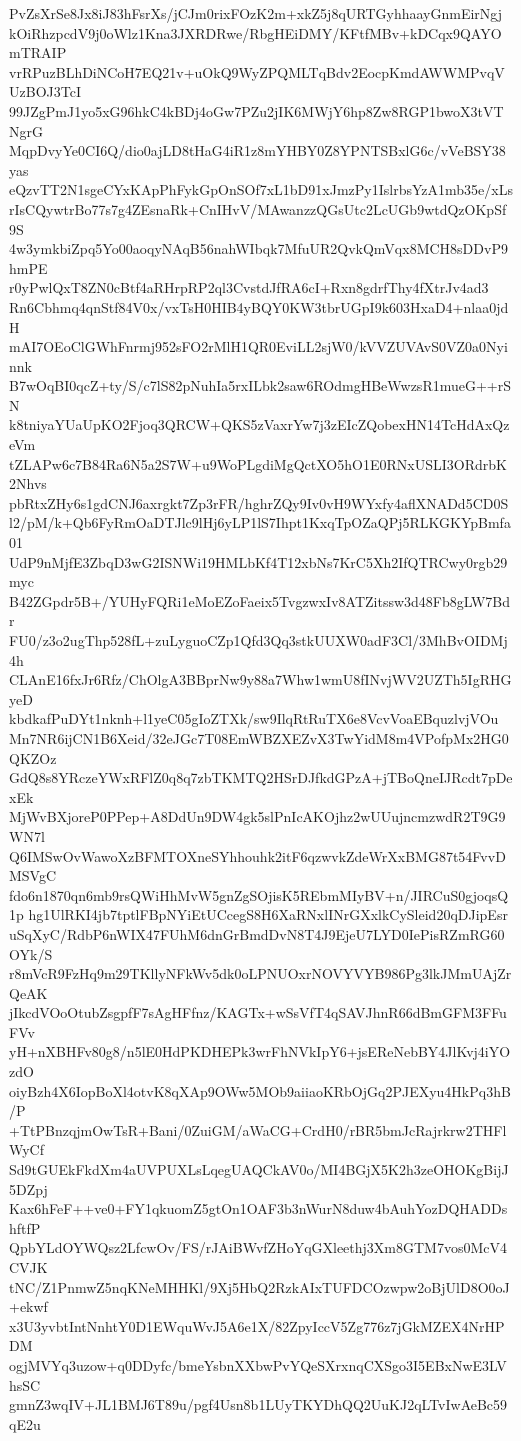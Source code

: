 PvZsXrSe8Jx8iJ83hFsrXs/jCJm0rixFOzK2m+xkZ5j8qURTGyhhaayGnmEirNgj
kOiRhzpcdV9j0oWlz1Kna3JXRDRwe/RbgHEiDMY/KFtfMBv+kDCqx9QAYOmTRAIP
vrRPuzBLhDiNCoH7EQ21v+uOkQ9WyZPQMLTqBdv2EocpKmdAWWMPvqVUzBOJ3TcI
99JZgPmJ1yo5xG96hkC4kBDj4oGw7PZu2jIK6MWjY6hp8Zw8RGP1bwoX3tVTNgrG
MqpDvyYe0CI6Q/dio0ajLD8tHaG4iR1z8mYHBY0Z8YPNTSBxlG6c/vVeBSY38yas
eQzvTT2N1sgeCYxKApPhFykGpOnSOf7xL1bD91xJmzPy1IslrbsYzA1mb35e/xLs
rIsCQywtrBo77s7g4ZEsnaRk+CnIHvV/MAwanzzQGsUtc2LcUGb9wtdQzOKpSf9S
4w3ymkbiZpq5Yo00aoqyNAqB56nahWIbqk7MfuUR2QvkQmVqx8MCH8sDDvP9hmPE
r0yPwlQxT8ZN0cBtf4aRHrpRP2ql3CvstdJfRA6cI+Rxn8gdrfThy4fXtrJv4ad3
Rn6Cbhmq4qnStf84V0x/vxTsH0HIB4yBQY0KW3tbrUGpI9k603HxaD4+nlaa0jdH
mAI7OEoClGWhFnrmj952sFO2rMlH1QR0EviLL2sjW0/kVVZUVAvS0VZ0a0Nyinnk
B7wOqBI0qcZ+ty/S/c7lS82pNuhIa5rxILbk2saw6ROdmgHBeWwzsR1mueG++rSN
k8tniyaYUaUpKO2Fjoq3QRCW+QKS5zVaxrYw7j3zEIcZQobexHN14TcHdAxQzeVm
tZLAPw6c7B84Ra6N5a2S7W+u9WoPLgdiMgQctXO5hO1E0RNxUSLI3ORdrbK2Nhvs
pbRtxZHy6s1gdCNJ6axrgkt7Zp3rFR/hghrZQy9Iv0vH9WYxfy4aflXNADd5CD0S
l2/pM/k+Qb6FyRmOaDTJlc9lHj6yLP1lS7Ihpt1KxqTpOZaQPj5RLKGKYpBmfa01
UdP9nMjfE3ZbqD3wG2ISNWi19HMLbKf4T12xbNs7KrC5Xh2IfQTRCwy0rgb29myc
B42ZGpdr5B+/YUHyFQRi1eMoEZoFaeix5TvgzwxIv8ATZitssw3d48Fb8gLW7Bdr
FU0/z3o2ugThp528fL+zuLyguoCZp1Qfd3Qq3stkUUXW0adF3Cl/3MhBvOIDMj4h
CLAnE16fxJr6Rfz/ChOlgA3BBprNw9y88a7Whw1wmU8fINvjWV2UZTh5IgRHGyeD
kbdkafPuDYt1nknh+l1yeC05gIoZTXk/sw9IlqRtRuTX6e8VcvVoaEBquzlvjVOu
Mn7NR6ijCN1B6Xeid/32eJGc7T08EmWBZXEZvX3TwYidM8m4VPofpMx2HG0QKZOz
GdQ8s8YRczeYWxRFlZ0q8q7zbTKMTQ2HSrDJfkdGPzA+jTBoQneIJRcdt7pDexEk
MjWvBXjoreP0PPep+A8DdUn9DW4gk5slPnIcAKOjhz2wUUujncmzwdR2T9G9WN7l
Q6IMSwOvWawoXzBFMTOXneSYhhouhk2itF6qzwvkZdeWrXxBMG87t54FvvDMSVgC
fdo6n1870qn6mb9rsQWiHhMvW5gnZgSOjisK5REbmMIyBV+n/JIRCuS0gjoqsQ1p
hg1UlRKI4jb7tptlFBpNYiEtUCcegS8H6XaRNxlINrGXxlkCySleid20qDJipEsr
uSqXyC/RdbP6nWIX47FUhM6dnGrBmdDvN8T4J9EjeU7LYD0IePisRZmRG60OYk/S
r8mVcR9FzHq9m29TKllyNFkWv5dk0oLPNUOxrNOVYVYB986Pg3lkJMmUAjZrQeAK
jIkcdVOoOtubZsgpfF7sAgHFfnz/KAGTx+wSsVfT4qSAVJhnR66dBmGFM3FFuFVv
yH+nXBHFv80g8/n5lE0HdPKDHEPk3wrFhNVkIpY6+jsEReNebBY4JlKvj4iYOzdO
oiyBzh4X6IopBoXl4otvK8qXAp9OWw5MOb9aiiaoKRbOjGq2PJEXyu4HkPq3hB/P
+TtPBnzqjmOwTsR+Bani/0ZuiGM/aWaCG+CrdH0/rBR5bmJcRajrkrw2THFlWyCf
Sd9tGUEkFkdXm4aUVPUXLsLqegUAQCkAV0o/MI4BGjX5K2h3zeOHOKgBijJ5DZpj
Kax6hFeF++ve0+FY1qkuomZ5gtOn1OAF3b3nWurN8duw4bAuhYozDQHADDshftfP
QpbYLdOYWQsz2LfcwOv/FS/rJAiBWvfZHoYqGXleethj3Xm8GTM7vos0McV4CVJK
tNC/Z1PnmwZ5nqKNeMHHKl/9Xj5HbQ2RzkAIxTUFDCOzwpw2oBjUlD8O0oJ+ekwf
x3U3yvbtIntNnhtY0D1EWquWvJ5A6e1X/82ZpyIccV5Zg776z7jGkMZEX4NrHPDM
ogjMVYq3uzow+q0DDyfc/bmeYsbnXXbwPvYQeSXrxnqCXSgo3I5EBxNwE3LVhsSC
gmnZ3wqIV+JL1BMJ6T89u/pgf4Usn8b1LUyTKYDhQQ2UuKJ2qLTvIwAeBc59qE2u
